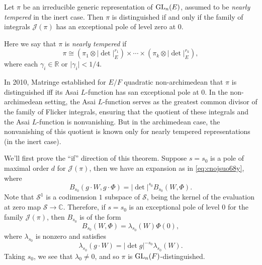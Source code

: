 \documentclass[reqno]{amsart} 
\begin{document}
\begin{theorem}[Y., 2024]\label{theorem:cnojsu3jzl}
  Let $\pi$ be an irreducible generic representation of $\operatorname{GL}_n(E)$, assumed to be \emph{nearly tempered} in the inert case.  Then $\pi$ is distinguished if and only if the family of integrals $\mathcal{J}(\pi)$ has an exceptional pole of level zero at $0$.
\end{theorem}

Here we say that $\pi$ is \emph{nearly tempered} if
\begin{equation*}
  \pi \cong   \left( \pi_1 \otimes \lvert \det \rvert_E^{r_1} \right)
  \times  \dotsb \times
  \left( \pi_k \otimes \lvert \det \rvert_E^{r_k} \right),
\end{equation*}
where each $\gamma_i \in \mathbb{R}$ or $\lvert \gamma_i \rvert < 1/4$.

In 2010, Matringe established for $E/F$ quadratic non-archimedean that $\pi$ is distinguished iff its Asai $L$-function has san exceptional pole at $0$.  In the non-archimedean setting, the Asai $L$-function serves as the greatest common divisor of the family of Flicker integrals, ensuring that the quotient of these integrals and the Asai $L$-function is nonvanishing.  But in the archimedean case, the nonvanishing of this quotient is known only for nearly tempered representations (in the inert case).

We'll first prove the ``if'' direction of this theorem.  Suppose $s = s_0$ is a pole of maximal order $d$ for $\mathcal{J}(\pi)$, then we have an expansion as in \eqref{eq:cnojsuo68y}, where
\begin{equation*}
  B_{s_0}(g \cdot W, g \cdot \Phi)
  =
  \lvert \det \rvert^{s_0}  B_{s_0}(W, \Phi).
\end{equation*}
Note that $\mathcal{S}^1$ is a codimension $1$ subspace of $\mathcal{S}$, being the kernel of the evaluation at zero map $\mathcal{S} \rightarrow \mathbb{C}$.  Therefore, if $s = s_0$ is an exceptional pole of level $0$ for the family $\mathcal{J}(\pi)$, then $B_{s_0}$ is of the form
\begin{equation*}
  B_{s_0}(W, \Phi) = \lambda_{s_0}(W) \Phi(0),
\end{equation*}
where $\lambda_{s_0}$ is nonzero and satisfies
\begin{equation*}
  \lambda_{s_0}(g \cdot W) = \lvert \det g \rvert^{- s_0} \lambda_{s_0}(W).
\end{equation*}
Taking $s_0$, we see that $\lambda_0 \neq 0$, and so $\pi$ is $\operatorname{GL}_n(F)$-distinguished.
\end{document}
